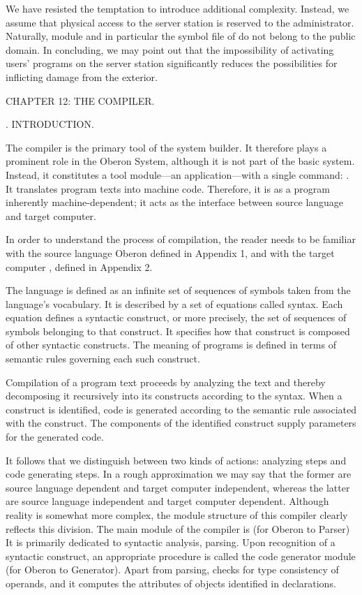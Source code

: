 We have resisted the temptation to introduce additional complexity. Instead, we assume that physical access to the server station is reserved to the administrator. Naturally, module  and in particular the symbol file of  do not belong to the public domain. In concluding, we may point out that the impossibility of activating users' programs on the server station significantly reduces the possibilities for inflicting damage from the exterior.

\beginchapter CHAPTER 12: THE COMPILER.

. INTRODUCTION.

The compiler is the primary tool of the system builder. It therefore plays a prominent role in the Oberon System, although it is not part of the basic system. Instead, it constitutes a tool module---an application---with a single command: . It translates program texts into machine code. Therefore, it is as a program inherently machine-dependent; it acts as the interface between source language and target computer.

In order to understand the process of compilation, the reader needs to be familiar with the source language Oberon defined in Appendix 1, and with the target computer , defined in Appendix 2.

The language is defined as an infinite set of sequences of symbols taken from the language's vocabulary. It is described by a set of equations called syntax. Each equation defines a syntactic construct, or more precisely, the set of sequences of symbols belonging to that construct. It specifies how that construct is composed of other syntactic constructs. The meaning of programs is defined in terms of semantic rules governing each such construct.

Compilation of a program text proceeds by analyzing the text and thereby decomposing it recursively into its constructs according to the syntax. When a construct is identified, code is generated according to the semantic rule associated with the construct. The components of the identified construct supply parameters for the generated code.

It follows that we distinguish between two kinds of actions: analyzing steps and code generating steps. In a rough approximation we may say that the former are source language dependent and target computer independent, whereas the latter are source language independent and target computer dependent. Although reality is somewhat more complex, the module structure of this compiler clearly reflects this division. The main module of the compiler is  (for Oberon to  Parser) It is primarily dedicated to syntactic analysis, parsing. Upon recognition of a syntactic construct, an appropriate procedure is called the code generator module  (for Oberon to  Generator). Apart from parsing,  checks for type consistency of operands, and it computes the attributes of objects identified in declarations.

